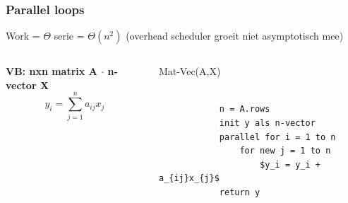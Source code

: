 \documentclass
   [kulak] %
   {kulakbeamer}
\begin{document}
\begin{frame}[fragile]
	\frametitle{Parallel loops}
	
	Work = $\Theta$ serie = $\Theta(n^2)$ (overhead scheduler groeit niet asymptotisch mee)
	
	\begin{columns}[T] %
		
		
		
		\begin{column}{.3\textwidth}
			\begin{minipage}[c][.6\textheight][c]{\linewidth}
				
				\textbf{VB: nxn matrix A $\cdot$ n-vector X}
				\\
				\[
				y_i = \sum_{j=1}^n a_{ij}x_{j}
				\]
				
			\end{minipage}
		\end{column}
		
		
		
		\begin{column}{.65\textwidth}
			
			Mat-Vec(A,X)
			\begin{lstlisting}[style=CStyle]
			
			n = A.rows
			init y als n-vector
			parallel for i = 1 to n
				for new j = 1 to n
					$y_i = y_i + a_{ij}x_{j}$
			return y
			\end{lstlisting}
			
		\end{column}

	
		
	\end{columns}
	
\end{frame}
\end{document}
